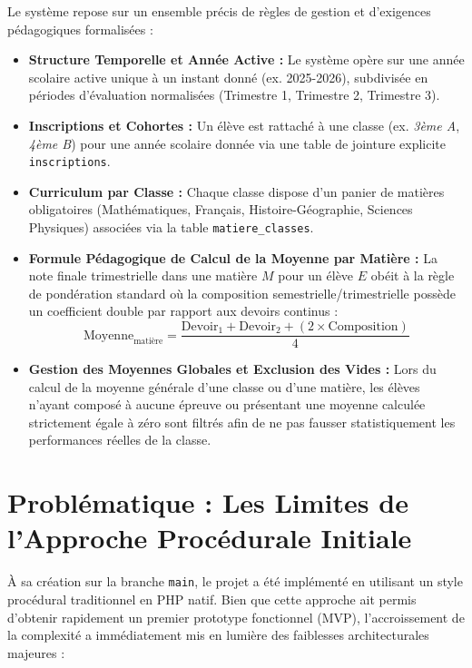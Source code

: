 \documentclass[11pt,a4paper,oneside]{report}
\begin{document}
Le système repose sur un ensemble précis de règles de gestion et d'exigences pédagogiques formalisées :
\begin{itemize}[label=\textcolor{primaryMed}{\textbullet}]
    \item \textbf{Structure Temporelle et Année Active :} Le système opère sur une année scolaire active unique à un instant donné (ex. 2025-2026), subdivisée en périodes d'évaluation normalisées (Trimestre 1, Trimestre 2, Trimestre 3).
    \item \textbf{Inscriptions et Cohortes :} Un élève est rattaché à une classe (ex. \textit{3ème A}, \textit{4ème B}) pour une année scolaire donnée via une table de jointure explicite \texttt{inscriptions}.
    \item \textbf{Curriculum par Classe :} Chaque classe dispose d'un panier de matières obligatoires (Mathématiques, Français, Histoire-Géographie, Sciences Physiques) associées via la table \texttt{matiere\_classes}.
    \item \textbf{Formule Pédagogique de Calcul de la Moyenne par Matière :} La note finale trimestrielle dans une matière $M$ pour un élève $E$ obéit à la règle de pondération standard où la composition semestrielle/trimestrielle possède un coefficient double par rapport aux devoirs continus :
    \begin{equation}
        \text{Moyenne}_{\text{matière}} = \frac{\text{Devoir}_1 + \text{Devoir}_2 + (2 \times \text{Composition})}{4}
        \label{eq:formule_moyenne}
    \end{equation}
    \item \textbf{Gestion des Moyennes Globales et Exclusion des Vides :} Lors du calcul de la moyenne générale d'une classe ou d'une matière, les élèves n'ayant composé à aucune épreuve ou présentant une moyenne calculée strictement égale à zéro sont filtrés afin de ne pas fausser statistiquement les performances réelles de la classe.
\end{itemize}

\section{Problématique : Les Limites de l'Approche Procédurale Initiale}

À sa création sur la branche \texttt{main}, le projet a été implémenté en utilisant un style procédural traditionnel en PHP natif. Bien que cette approche ait permis d'obtenir rapidement un premier prototype fonctionnel (MVP), l'accroissement de la complexité a immédiatement mis en lumière des faiblesses architecturales majeures :
\end{document}
